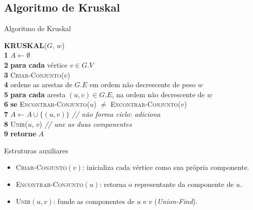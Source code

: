 \documentclass[9pt]{beamer}
\begin{document}
\subsection{Algoritmo de Kruskal}
\begin{frame}{Algoritmo de Kruskal}
    \vspace{-0.1cm}
    \begin{ttfamily}
    \textbf{KRUSKAL}($G$, $w$) \\
    \textbf{1} \hspace{0.4cm} $A \leftarrow \emptyset$ \\
    \textbf{2} \hspace{0.4cm} \textbf{para cada} vértice $v \in G.V$ \\
    \textbf{3} \hspace{0.8cm} \textsc{Criar-Conjunto}($v$) \\
    \textbf{4} \hspace{0.4cm} ordene as arestas de $G.E$ em ordem não decrescente de peso $w$ \\
    \textbf{5} \hspace{0.4cm} \textbf{para cada} aresta $(u, v) \in G.E$, na ordem não decrescente de $w$ \\
    \textbf{6} \hspace{0.8cm} \textbf{se} \textsc{Encontrar-Conjunto}($u$) $\neq$ \textsc{Encontrar-Conjunto}($v$) \\
    \textbf{7} \hspace{1.2cm} $A \leftarrow A \cup \{(u, v)\}$ \hspace{0.3cm} \textit{// não forma ciclo: adiciona} \\
    \textbf{8} \hspace{1.2cm} \textsc{Unir}($u$, $v$) \hspace{0.3cm} \textit{// une as duas componentes} \\
    \textbf{9} \hspace{0.4cm} \textbf{retorne} $A$
    \end{ttfamily}
    \vspace{0.25cm}
    \begin{block}{Estruturas auxiliares}
        \begin{itemize}
            \item \textsc{Criar-Conjunto}$(v)$: inicializa cada vértice como sua própria componente.
            \item \textsc{Encontrar-Conjunto}$(u)$: retorna o representante da componente de $u$.
            \item \textsc{Unir}$(u,v)$: funde as componentes de $u$ e $v$ (\textit{Union-Find}).
        \end{itemize}
    \end{block}
\end{frame}
\end{document}
